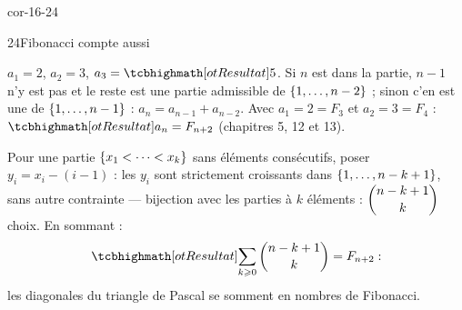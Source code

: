\begin{blocLivre}{cor-16-24}
\begin{corrige}{24}{Fibonacci compte aussi}
\begin{questions}
  \item $a_1=2$, $a_2=3$, $a_3=\res{5}$. Si $n$ est dans la partie, $n-1$
    n'y est pas et le reste est une partie admissible de
    $\left\{1,\dots,n-2\right\}$ ; sinon c'en est une de $\left\{1,\dots,n-1\right\}$ :
    $a_n=a_{n-1}+a_{n-2}$. Avec $a_1=2=F_3$ et $a_2=3=F_4$ :
    $\res{a_n=F_{n+2}}$ (chapitres 5, 12 et 13).
  \item Pour une partie $\left\{x_1<\dots<x_k\right\}$ sans éléments consécutifs,
    poser $y_i=x_i-(i-1)$ : les $y_i$ sont strictement croissants dans
    $\left\{1,\dots,n-k+1\right\}$, sans autre contrainte — bijection avec les
    parties à $k$ éléments : $\dbinom{n-k+1}{k}$ choix. En sommant :
    \[
    \res{\sum_{k\geqslant0}\binom{n-k+1}{k}=F_{n+2}} :
    \]
    les diagonales du triangle de Pascal se somment en nombres de
    Fibonacci.
\end{questions}
\end{corrige}
\end{blocLivre}


